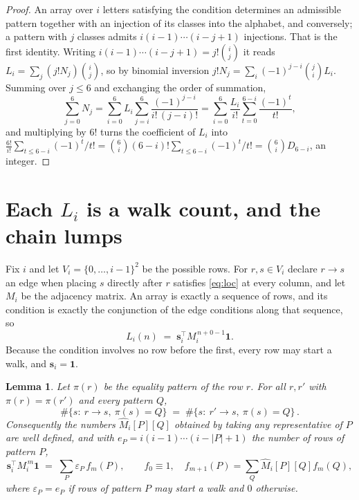 \documentclass[11pt,a4paper]{article}
\theoremstyle{plain}
\newtheorem{lemma}[theorem]{Lemma}
\theoremstyle{definition}
\begin{document}
\begin{proof}
An array over $i$ letters satisfying the condition determines an admissible pattern together
with an injection of its classes into the alphabet, and conversely; a pattern with $j$
classes admits $i(i-1)\cdots(i-j+1)$ injections. That is the first identity. Writing
$i(i-1)\cdots(i-j+1)=j!\binom{i}{j}$ it reads $L_i=\sum_j (j!N_j)\binom{i}{j}$, so by
binomial inversion $j!N_j=\sum_{i}(-1)^{j-i}\binom{j}{i}L_i$. Summing over
$j\le 6$ and exchanging the order of summation,
\[
\sum_{j=0}^{6}N_j=\sum_{i=0}^{6}L_i\sum_{j=i}^{6}\frac{(-1)^{j-i}}{i!\,(j-i)!}
=\sum_{i=0}^{6}\frac{L_i}{i!}\sum_{t=0}^{6-i}\frac{(-1)^t}{t!} ,
\]
and multiplying by $6!$ turns the coefficient of $L_i$ into
$\frac{6!}{i!}\sum_{t\le 6-i}(-1)^t/t!=\binom{6}{i}(6-i)!\sum_{t\le 6-i}(-1)^t/t!
=\binom{6}{i}D_{6-i}$, an integer.
\end{proof}

\section{Each $L_i$ is a walk count, and the chain lumps}

Fix $i$ and let $V_i=\{0,\dots,i-1\}^{2}$ be the possible rows. For $r,s\in V_i$
declare $r\to s$ an edge when placing $s$ directly after $r$ satisfies \eqref{eq:loc} at
every column, and let $M_i$ be the adjacency matrix. An array is exactly a sequence of
rows, and its condition is exactly the conjunction of the edge conditions along that
sequence, so
\[
L_i(n)\;=\;\mathbf{s}_i^{\!\top}M_i^{\,n+0-1}\mathbf{1} .
\]
Because the condition involves no row before the first, every
row may start a walk, and $\mathbf{s}_i=\mathbf{1}$.

\begin{lemma}\label{lem:lump}
Let $\pi(r)$ be the equality pattern of the row $r$. For all $r,r'$ with
$\pi(r)=\pi(r')$ and every pattern $Q$,
\[
\#\{s:\ r\to s,\ \pi(s)=Q\}\;=\;\#\{s:\ r'\to s,\ \pi(s)=Q\}\, .
\]
Consequently the numbers $\widehat M_i[P][Q]$ obtained by taking any representative of $P$
are well defined, and with $e_P=i(i-1)\cdots(i-|P|+1)$ the number of rows of pattern $P$,
\[
\mathbf{s}_i^{\!\top}M_i^{\,m}\mathbf{1}\;=\;\sum_P \varepsilon_P\,f_m(P),
\qquad f_0\equiv1,\quad f_{m+1}(P)=\sum_Q\widehat M_i[P][Q]f_m(Q),
\]
where $\varepsilon_P=e_P$ if rows of pattern $P$ may start a walk and $0$ otherwise.
\end{lemma}
\end{document}
